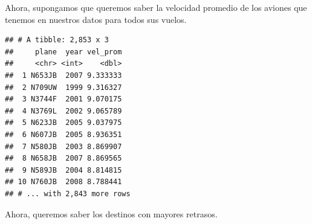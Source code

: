 \documentclass[]{article}
\newenvironment{Shaded}{\begin{snugshade}}{\end{snugshade}}
\newcommand{\KeywordTok}[1]{\textcolor[rgb]{0.13,0.29,0.53}{\textbf{#1}}}
\newcommand{\DataTypeTok}[1]{\textcolor[rgb]{0.13,0.29,0.53}{#1}}
\newcommand{\StringTok}[1]{\textcolor[rgb]{0.31,0.60,0.02}{#1}}
\newcommand{\CommentTok}[1]{\textcolor[rgb]{0.56,0.35,0.01}{\textit{#1}}}
\newcommand{\OperatorTok}[1]{\textcolor[rgb]{0.81,0.36,0.00}{\textbf{#1}}}
\newcommand{\NormalTok}[1]{#1}
\begin{document}
Ahora, supongamos que queremos saber la velocidad promedio de los
aviones que tenemos en nuestros datos para todos sus vuelos.

\begin{Shaded}
\end{Shaded}

\begin{verbatim}
## # A tibble: 2,853 x 3
##     plane  year vel_prom
##     <chr> <int>    <dbl>
##  1 N653JB  2007 9.333333
##  2 N709UW  1999 9.316327
##  3 N3744F  2001 9.070175
##  4 N3769L  2002 9.065789
##  5 N623JB  2005 9.037975
##  6 N607JB  2005 8.936351
##  7 N580JB  2003 8.869907
##  8 N658JB  2007 8.869565
##  9 N589JB  2004 8.814815
## 10 N760JB  2008 8.788441
## # ... with 2,843 more rows
\end{verbatim}

Ahora, queremos saber los destinos con mayores retrasos.

\begin{Shaded}
\end{Shaded}
\end{document}
